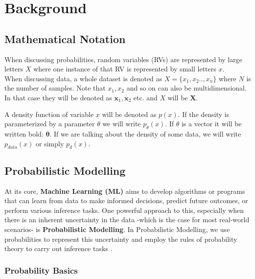 \usetikzlibrary{calc}

\renewcommand{\vec}[1]{\textbf{#1}}
\newcommand{\norm}[1]{\left\lVert#1\right\rVert}


\chapter{Background}
\label{cha:background}

\section{Mathematical Notation}

When discussing probabilities, random variables (RVs) are represented by large letters $X$ where one instance of that RV is represented 
by small letters $x$. \\ 
When discussing data, a whole dataset is denoted as $X = \{x_1, x_2 .. , x_n\}$ where $N$ is the number of samples. 
Note that $x_1, x_2$ and so on can also be multidimensional. In that case they will be denoted as $\vec x_1, \vec x_2$ etc. and $X$ will be $\vec X$.

A density function of variable $x$ will be denoted as $p(x)$. If the density is parameterized by a parameter $\theta$ we will write 
$p_\theta(x)$. If $\theta$ is a vector it will be written bold: $\boldsymbol{\theta}$.
If we are talking about the density of some data, we will write $p_{data}(x)$ or simply $p_d(x)$.

\section{Probabilistic Modelling}
\label{sec:pm}

At its core, \textbf{Machine Learning (ML)} aims to develop algorithms or programs that can learn from data to make informed decisions, predict future outcomes, or perform various inference tasks. 
One powerful approach to this, especially when there is an inherent 
uncertainty in the data -which is the case for most real-world scenarios- is \textbf{Probabilistic Modelling}.
In Probabilistic Modelling, we use probabilities to represent this uncertainty and employ the rules of probability theory to carry out inference tasks \cite{pc_intro}.

\subsection{Probability Basics}
\label{sec:prob_basics}

